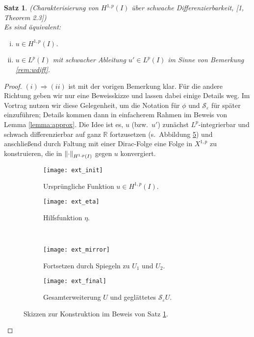 \documentclass[twoside]{article}
\newcounter{lecnum}
\renewcommand{\cite}[1]{[#1]}
\newtheorem{theorem}{Satz}[lecnum]
\theoremstyle{definition}
\newcommand{\calS}{\mathcal{S}}
\newcommand{\R}{\mathbb{R}}
\begin{document}
\begin{theorem} (Charakterisierung von $H^{1,p}(I)$ über schwache Differenzierbarkeit, \cite{1, Theorem 2.3}) \label{thm:wdiff}\\
Es sind äquivalent:
\begin{enumerate}[(i)]
\item $u \in H^{1,p}(I)$.
\item $u \in L^p(I)$ mit schwacher Ableitung $u' \in L^p(I)$ im Sinne von Bemerkung \ref{rem:wdiff}.
\end{enumerate}
\end{theorem}
\begin{proof} $(i) \Rightarrow (ii)$ ist mit der vorigen Bemerkung klar. Für die andere Richtung geben wir nur eine Beweisskizze und lassen dabei einige Details weg. Im Vortrag nutzen wir diese Gelegenheit, um die Notation für $\phi$ und $\calS_\varepsilon$ für später einzuführen; Details kommen dann in einfacherem Rahmen im Beweis von Lemma \ref{lemma:approx}. Die Idee ist es, $u$ (bzw.\ $u'$) zunächst $L^p$-integrierbar und schwach differenzierbar auf ganz $\R$ fortzusetzen (s.\ Abbildung \ref{fig:ext}) und anschließend durch Faltung mit einer Dirac-Folge eine Folge in $X^{1,p}$ zu konstruieren, die in $\norm{\cdot}_{H^{1,p}(I)}$ gegen $u$ konvergiert.\\

\begin{figure}
\centering
	\begin{subfigure}[t]{0.49 \textwidth}
	\vskip 0pt
		\centering
		\texttt{[image: ext\_init]}
		\caption{Ursprüngliche Funktion $u \in H^{1,p}(I)$.}
		\label{fig:ext_init}		
	\end{subfigure}
	\begin{subfigure}[t]{0.49 \textwidth}
	\vskip 0pt
		\centering
		\texttt{[image: ext\_eta]}
		\caption{Hilfsfunktion $\eta$.}
		\label{fig:ext_eta}
	\end{subfigure}\\
		\begin{subfigure}[t]{0.49 \textwidth}
	\vskip 0pt
		\centering
		\texttt{[image: ext\_mirror]}
		\caption{Fortsetzen durch Spiegeln zu $U_1$ und $U_2$.}
		\label{fig:ext_mirror}		
	\end{subfigure}
	\begin{subfigure}[t]{0.49 \textwidth}
	\vskip 0pt
		\centering
		\texttt{[image: ext\_final]}
		\caption{Gesamterweiterung $U$ und geglättetes $\calS_\varepsilon U$.}	
	\label{fig:ext_final}
	\end{subfigure}
\caption{Skizzen zur Konstruktion im Beweis von Satz \ref{thm:wdiff}.}
\label{fig:ext}
\end{figure}


\end{proof}
\end{document}
